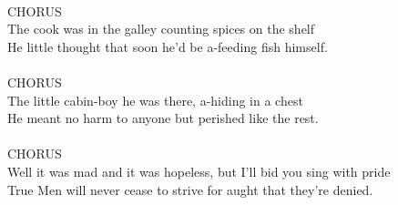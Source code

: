 \\CHORUS
\\
The cook was in the galley counting spices on the shelf
\\
He little thought that soon he’d be a-feeding fish himself.
\\
\\CHORUS
\\
The little cabin-boy he was there, a-hiding in a chest
\\
He meant no harm to anyone but perished like the rest.
\\
\\CHORUS
\\
Well it was mad and it was hopeless, but I’ll bid you sing with pride
\\
True Men will never cease to strive for aught that they’re denied.
